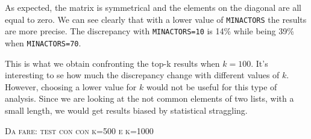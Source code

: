 \nd As expected, the matrix is symmetrical and the elements on the diagonal are all equal to zero. We can see clearly that with a lower value of \texttt{MIN\textunderscore ACTORS} the results are more precise. The discrepancy with \texttt{MIN\textunderscore ACTORS=10} is 14\% while being 39\% when \texttt{MIN\textunderscore ACTORS=70}. \s

\nd This is what we obtain confronting the top-k results when $k=100$. It's interesting to se how much the discrepancy change with different values of $k$. However, choosing a lower value for $k$ would not be useful for this type of analysis. Since we are looking at the not common elements of two lists, with a small length, we would get results biased by statistical straggling. \s

\textsc{Da fare: test con con k=500 e k=1000}

